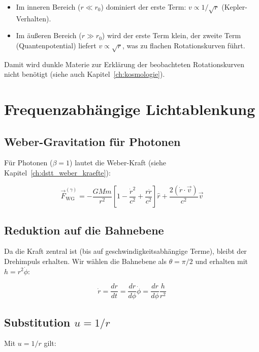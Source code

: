 \begin{itemize}
    \item Im inneren Bereich (\( r \ll r_0 \)) dominiert der erste Term: \( v \propto 1/\sqrt{r} \) (Kepler-Verhalten).
    \item Im äußeren Bereich (\( r \gg r_0 \)) wird der erste Term klein, der zweite Term (Quantenpotential) liefert \( v \propto \sqrt{r} \), was zu flachen Rotationskurven führt.
\end{itemize}

Damit wird dunkle Materie zur Erklärung der beobachteten Rotationskurven nicht benötigt (siehe auch Kapitel~\ref{ch:kosmologie}).

\section{Frequenzabhängige Lichtablenkung}
\label{app:herleitungen_lichtablenkung}

\subsection{Weber-Gravitation für Photonen}
\label{sub:herleitungen_licht_weber}

Für Photonen (\(\beta = 1\)) lautet die Weber-Kraft (siehe Kapitel~\ref{ch:dstt_weber_kraefte}):

\[
\vec{F}_{\text{WG}}^{(\gamma)} = -\frac{GMm}{r^2} \left[ 1 - \frac{\dot{r}^2}{c^2} + \frac{r\ddot{r}}{c^2} \right] \hat{r} + \frac{2(\dot{r} \cdot \vec{v})}{c^2} \vec{v} \tag{D.10}
\]

\subsection{Reduktion auf die Bahnebene}
\label{sub:herleitungen_licht_bahn}

Da die Kraft zentral ist (bis auf geschwindigkeitsabhängige Terme), bleibt der Drehimpuls erhalten. Wir wählen die Bahnebene als \(\theta = \pi/2\) und erhalten mit \(h = r^2\dot{\phi}\):

\[
\dot{r} = \frac{dr}{dt} = \frac{dr}{d\phi} \dot{\phi} = \frac{dr}{d\phi} \frac{h}{r^2}
\]

\subsection{Substitution \(u = 1/r\)}
\label{sub:herleitungen_licht_subst}

Mit \(u = 1/r\) gilt:

